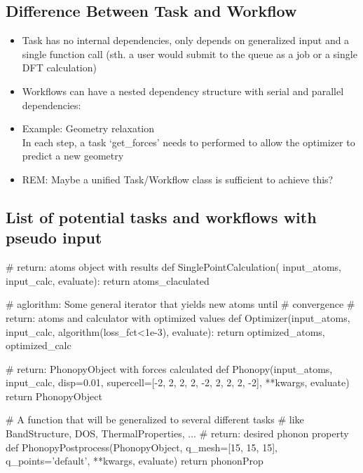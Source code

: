 \documentclass [notitlepage, 12pt, a4paper]{article}
\begin{document}
\subsection{Difference Between Task and Workflow}
\begin{itemize}
\item Task has no internal dependencies, only depends on generalized input and a single function call (sth. a user would submit to the queue as a job or a single DFT calculation)
\item Workflows can have a nested dependency structure with serial and parallel dependencies:
\item Example: Geometry relaxation\\
In each step, a task ‘get\_forces’ needs to performed to allow the optimizer to predict a new geometry
\item \textcolor{deepred}{REM: Maybe a unified Task/Workflow class is sufficient to achieve this?}
\end{itemize}

\subsection{List of potential tasks and workflows with pseudo input}

\begin{python}
# return: atoms object with results
def SinglePointCalculation( input_atoms, input_calc, evaluate):
    return atoms_claculated
\end{python}

\begin{python}
# aglorithm: Some general iterator that yields new atoms until
# convergence
# return: atoms and calculator with optimized values
def Optimizer(input_atoms, input_calc,
              algorithm(loss_fct<1e-3), evaluate):
    return optimized_atoms, optimized_calc
\end{python}

\begin{python}
# return: PhonopyObject with forces calculated
def Phonopy(input_atoms, input_calc, {disp=0.01,
            supercell=[-2, 2, 2, 2, -2, 2, 2, 2, -2], **kwargs},
            evaluate)
    return PhonopyObject
\end{python}

\begin{python}
# A function that will be generalized to several different tasks
# like BandStructure, DOS, ThermalProperties, ...
# return: desired phonon property
def PhonopyPostprocess(PhonopyObject, {q_mesh=[15, 15, 15],
                       q_points='default', **kwargs}, evaluate)
    return  phononProp
\end{python}
\end{document}
